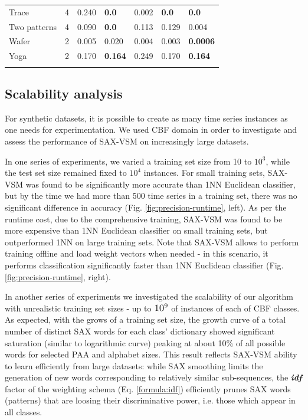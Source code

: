 \documentclass[conference]{IEEEtran}
\begin{document}
\begin{footnotesize}
\begin{table}[t]
\begin{tabularx}{\linewidth}{@{} l *6X @{}}
Trace       &4   & 0.240   & \textbf{0.0}    & 0.002  & \textbf{0.0} & \textbf{0.0} \\
Two patterns &4   & 0.090   & \textbf{0.0}    & 0.113   & 0.129      & 0.004 \\
Wafer        &2    & 0.005   & 0.020     & 0.004  & 0.003 & \textbf{0.0006} \\
Yoga        &2    & 0.170   & \textbf{0.164}  & 0.249 & 0.170 & \textbf{0.164} \\
\hline
\vspace{0.1cm}
\end{tabularx}
\end{table}
\end{footnotesize}

\subsection{Scalability analysis} \label{scalability}
For synthetic datasets, it is possible to create as many time series instances as 
one needs for experimentation.
We used CBF \cite{cbf} domain in order to investigate and assess the performance 
of SAX-VSM on increasingly large datasets.

In one series of experiments, we varied a training set size from 10 to $10^{3}$, while 
the test set size remained fixed to $10^{4}$ instances. 
For small training sets, SAX-VSM was found to be significantly more accurate than 
1NN Euclidean classifier, but by the time we had more than 500 time series in a training set, 
there was no significant difference in accuracy (Fig. \ref{fig:precision-runtime}, left). 
As per the runtime cost, due to the comprehensive training, SAX-VSM was found to 
be more expensive than 1NN Euclidean classifier on small training sets, 
but outperformed 1NN on large training sets. Note that SAX-VSM allows to perform training 
offline and load weight vectors when needed - in this scenario, it performs classification 
significantly faster than 1NN Euclidean classifier (Fig. \ref{fig:precision-runtime}, right).

In another series of experiments we investigated the scalability of our algorithm with
unrealistic training set sizes - up to $\normalsize{10^{9}}$ of instances of each of CBF classes.
As expected, with the grows of a training set size, the growth curve of a total number of 
distinct SAX words for each class' dictionary showed significant saturation 
(similar to logarithmic curve) peaking at about 10\% of all possible words for selected 
PAA and alphabet sizes.
This result reflects SAX-VSM ability to learn efficiently from large datasets: 
while SAX smoothing limits the generation of new words corresponding to 
relatively similar sub-sequences, the \textbf{\textit{idf}} factor of the weighting 
schema (Eq. \ref{formula:idf}) efficiently prunes SAX words (patterns) 
that are loosing their discriminative power, i.e. those which appear in all classes.
\end{document}
